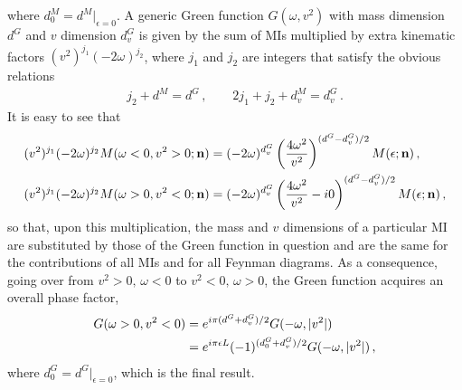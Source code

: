 \documentclass[12pt]{article}
\numberwithin{equation}{section}
\newcommand{\1}[1]{\mathbf{1}^{#1}}
\newcommand{\2}[1]{\mathbf{2}^{#1}}
\newcommand{\3}[1]{\mathbf{3}^{#1}}
\newcommand{\4}[1]{\mathbf{4}^{#1}}
\newcommand{\5}[1]{\mathbf{5}^{#1}}
\newcommand{\ep}{\epsilon}
\newcommand{\vv}{v^2}
\begin{document}
where $d_0^M  =d^M|_{\ep=0}$.
A generic Green function $G(\omega, \vv)$ with mass dimension $d^G$ and $v$ dimension $d^G_v$ is given by the 
sum of MIs multiplied by extra kinematic factors $(\vv)^{j_1}(-2\omega)^{j_2}$,
where 
$j_1$ and $j_2$ are integers that satisfy the obvious relations 
\begin{align}
j_2 + d^M = d^G\,, \qquad  2 j_1 + j_2  + d^M_v = d^G_v\,.
\end{align}
It is easy to see that
\begin{align}
 (\vv)^{j_1}(-2\omega)^{j_2} M(\omega < 0, \vv > 0; \bf{n}) &= 
(-2\omega )^{d^G_v} \left(\frac{4\omega^2}{\vv}\right)^{(d^G-d^G_v)/2} M(\ep;\mathbf{n})\,, 
\notag\\
 (\vv)^{j_1}(-2\omega)^{j_2} M(\omega > 0, \vv < 0; \bf{n}) &=
 (-2\omega )^{d^G_v} \left(\frac{4\omega^2}{\vv}-i0\right)^{(d^G-d^G_v)/2} M(\ep;\mathbf{n})\,, 
\end{align}
so that, upon this multiplication, the mass and $v$ dimensions of 
a particular MI are substituted by those of the Green function in question 
and are the same for the contributions of all MIs and for all Feynman diagrams.
As a consequence, going over from $\vv>0,\, \omega <0$ to $\vv <0,\, \omega >0$,  
the Green function acquires an overall phase factor, 
\begin{align}
   G(\omega > 0, \vv < 0) &= e^{i\pi(d^G+d^G_v)/2} G(-\omega, |\vv|)
\notag\\&
= e^{i\pi\epsilon L} (-1)^{(d_0^G+d^G_v)/2} G(- \omega, |\vv| ) \,, 
\end{align}
where $d_0^G  =d^G|_{\ep=0}$, which is the final result. 
\end{document}

